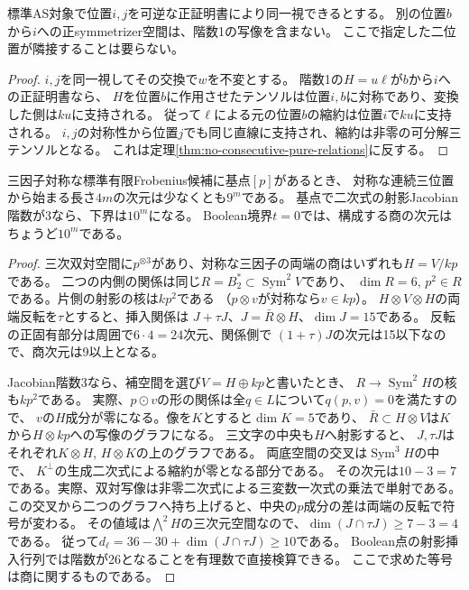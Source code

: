 \begin{corollary}[正証明書のある対への階数1写像]\label{cor:no-rank-one-into-positive-pair}
標準AS対象で位置$i,j$を可逆な正証明書により同一視できるとする。
別の位置$b$から$i$への正symmetrizer空間は、階数1の写像を含まない。
ここで指定した二位置が隣接することは要らない。
\end{corollary}
\begin{proof}
$i,j$を同一視してその交換で$w$を不変とする。
階数1の$H=u\ell$が$b$から$i$への正証明書なら、
$H$を位置$b$に作用させたテンソルは位置$i,b$に対称であり、変換した側は$ku$に支持される。
従って$\ell$による元の位置$b$の縮約は位置$i$で$ku$に支持される。
$i,j$の対称性から位置$j$でも同じ直線に支持され、縮約は非零の可分解三テンソルとなる。
これは定理\ref{thm:no-consecutive-pure-relations}に反する。
\end{proof}

\begin{corollary}[三因子対称な基点枝の全次数成長]\label{cor:basepoint-exponential-growth}
三因子対称な標準有限Frobenius候補に基点$[p]$があるとき、
対称な連続三位置から始まる長さ$4m$の次元は少なくとも$9^m$である。
基点で二次式の射影Jacobian階数が3なら、下界は$10^m$になる。
Boolean境界$t=0$では、構成する商の次元はちょうど$10^m$である。
\end{corollary}
\begin{proof}
三次双対空間に$p^{\otimes3}$があり、対称な三因子の両端の商はいずれも$H=V/kp$である。
二つの内側の関係は同じ$R=B_2^*\subset\operatorname{Sym}^2 V$であり、
$\dim R=6$, $p^2\in R$である。片側の射影の核は$kp^2$である
（$p\otimes v$が対称なら$v\in kp$）。
$H\otimes V\otimes H$の両端反転を$\tau$とすると、挿入関係は
$J+\tau J$、$J=\bar R\otimes H$、$\dim J=15$である。
反転の正固有部分は周囲で$6\cdot4=24$次元、関係側で
$(1+\tau)J$の次元は15以下なので、商次元は9以上となる。

Jacobian階数3なら、補空間を選び$V=H\oplus kp$と書いたとき、
$R\to\operatorname{Sym}^2 H$の核も$kp^2$である。
実際、$p\odot v$の形の関係は全$q\in L$について$q(p,v)=0$を満たすので、
$v$の$H$成分が零になる。像を$K$とすると$\dim K=5$であり、
$\bar R\subset H\otimes V$は$K$から$H\otimes kp$への写像のグラフになる。
三文字の中央も$H$へ射影すると、
$J,\tau J$はそれぞれ$K\otimes H$, $H\otimes K$の上のグラフである。
両底空間の交叉は$\operatorname{Sym}^3 H$の中で、
$K^\perp$の生成二次式による縮約が零となる部分である。
その次元は$10-3=7$である。実際、双対写像は非零二次式による三変数一次式の乗法で単射である。
この交叉から二つのグラフへ持ち上げると、中央の$p$成分の差は両端の反転で符号が変わる。
その値域は$\bigwedge^2 H$の三次元空間なので、$\dim(J\cap\tau J)\ge7-3=4$である。
従って$d_\ell=36-30+\dim(J\cap\tau J)\ge10$である。
Boolean点の射影挿入行列では階数が26となることを有理数で直接検算できる。
ここで求めた等号は商に関するものである。
\end{proof}

